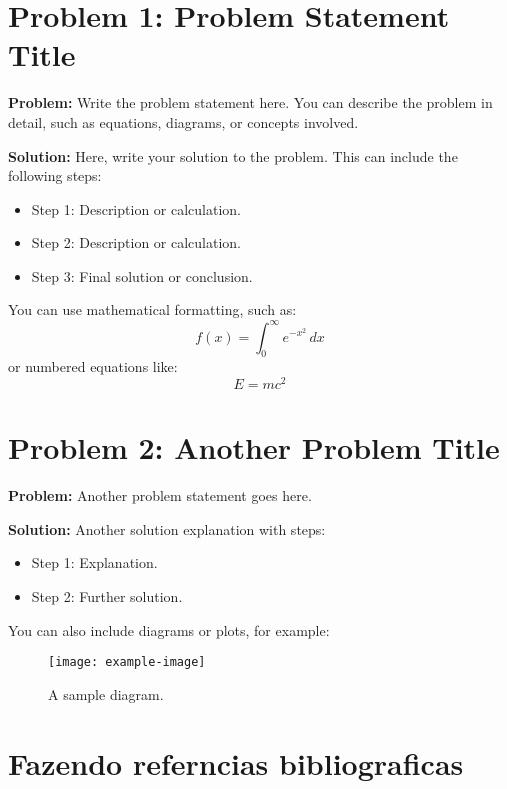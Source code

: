 

\section{Problem 1: Problem Statement Title}
\textbf{Problem:} Write the problem statement here. You can describe the problem in detail, such as equations, diagrams, or concepts involved.

\vspace{1em} %

\textbf{Solution:} Here, write your solution to the problem. This can include the following steps:
\begin{itemize}
    \item Step 1: Description or calculation.
    \item Step 2: Description or calculation.
    \item Step 3: Final solution or conclusion.
\end{itemize}

You can use mathematical formatting, such as:
\[
f(x) = \int_{0}^{\infty} e^{-x^2} \, dx
\]
or numbered equations like:
\begin{equation}
    E = mc^2
\end{equation}

\newpage

\section*{Problem 2: Another Problem Title}
\textbf{Problem:} Another problem statement goes here.

\vspace{1em}

\textbf{Solution:} Another solution explanation with steps:
\begin{itemize}
    \item Step 1: Explanation.
    \item Step 2: Further solution.
\end{itemize}

You can also include diagrams or plots, for example:
\begin{figure}[h]
    \centering
    \texttt{[image: example-image]} %
    \caption{A sample diagram.}
    \label{fig:sample-diagram}
\end{figure}

\newpage

\section{Fazendo referncias bibliograficas}

